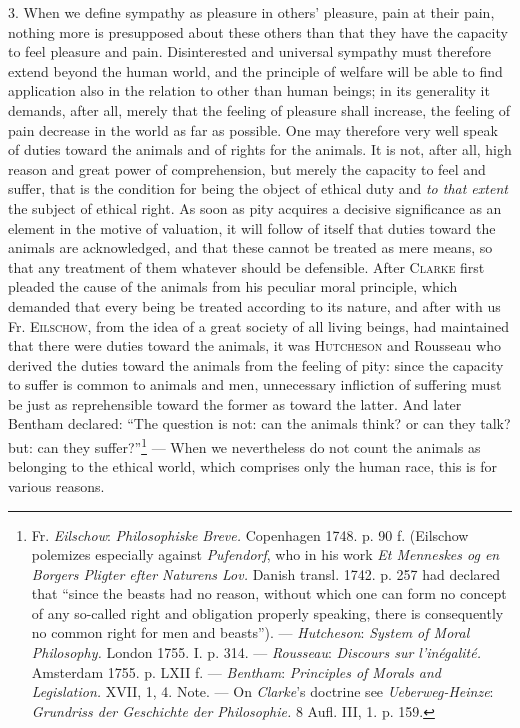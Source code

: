 \documentclass[12pt,a4paper,openany]{book}
\newcommand{\opage}[1]{\marginnote{\footnotesize\textit{[#1]}}}
\begin{document}
3. When we define sympathy as pleasure in others' pleasure, pain at their pain, nothing more is presupposed about
these others than that they have the capacity to feel pleasure and pain. Disinterested and universal sympathy must
therefore extend beyond the human world, and the principle of welfare will be able to find application also in the
relation to other than human beings; in its generality it demands, after all, merely that the feeling of pleasure shall
increase, the feeling of pain decrease in the world as far as possible. One may therefore very well speak of duties
toward the animals and of rights for the animals. It is not, after all, high reason and great power of comprehension,
but merely the capacity to feel and suffer, that is the condition for being the object of ethical duty and
\textit{to that extent} the subject of ethical right. As soon as pity acquires a decisive significance as an element in
the motive of valuation, it will follow of itself that duties toward the animals are acknowledged, and that these
cannot be treated as mere means, so that any treatment of them whatever should be defensible. After \textsc{Clarke}
first pleaded the cause of the animals from his peculiar moral principle, which demanded that every being be treated
according to its nature, and after with us Fr. \textsc{Eilschow}, from the idea of a great society of all living
beings, had maintained that there were duties toward the animals, it was \textsc{Hutcheson} and Rousseau who derived
the duties toward the animals from the feeling of pity: since the capacity to suffer is common to animals and men,
unnecessary infliction of suffering must be just as reprehensible toward the former as toward the latter. And later
Bentham declared: ``The question is not: can the animals think? or can they talk? but: can they
suffer?''\footnote[1]{Fr. \emph{Eilschow}: \textit{Philosophiske Breve.} Copenhagen 1748. p. 90 f. (Eilschow polemizes
especially against \emph{Pufendorf}, who in his work \textit{Et Menneskes og en Borgers Pligter efter Naturens Lov.}
Danish transl. 1742. p. 257 had declared that ``since the beasts had no reason, without which one can form no concept
of any so-called right and obligation properly speaking, there is consequently no common right for men and beasts'').
--- \emph{Hutcheson}: \textit{System of Moral Philosophy.} London 1755. I. p. 314. --- \emph{Rousseau}: \textit{Discours sur l'inégalité.}
Amsterdam 1755. p. LXII f. --- \emph{Bentham}: \textit{Principles of Morals and Legislation.} XVII, 1, 4. Note. --- On \emph{Clarke}'s
doctrine see \emph{Ueberweg-Heinze}: \textit{Grundriss der Geschichte der Philosophie.} 8 Aufl. III, 1. p. 159.} %
--- When we nevertheless do not count the animals
\opage{248}as belonging to the ethical world, which comprises only the human race, this is for various reasons.
\end{document}
